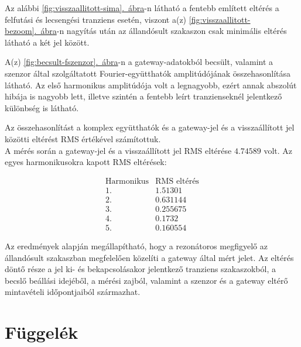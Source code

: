 \documentclass[12pt,a4paper]{article}
\newcommand{\abrara}[1]{\hyperref[#1]{\ref*{#1}.~ábra}}
\begin{document}
Az alábbi \abrara{fig:visszaallitott-sima}-n látható a fentebb említett eltérés a felfutási és lecsengési tranziens esetén, viszont a(z) \abrara{fig:visszaallitott-bezoom}-n nagyítás után az állandósult szakaszon csak minimális eltérés látható a két jel között.




A(z) \abrara{fig:becsult-fszenzor}-n a gateway-adatokból becsült, valamint a szenzor által
szolgáltatott Fourier-együtthatók amplitúdójának összehasonlítása látható. Az
első harmonikus amplitúdója volt a legnagyobb, ezért annak abszolút
hibája is nagyobb lett, illetve szintén a fentebb leírt tranzienseknél jelentkező különbség is látható.


Az összehasonlítást a komplex együtthatók és a gateway-jel és a visszaállított jel közötti eltérést RMS értékével számítottuk.\\

A mérés során a gateway-jel és a visszaállított jel RMS eltérése
$4.74589$ volt. Az egyes harmonikusokra kapott RMS eltérések:

\begin{equation}
\begin{array}{c|c}
\text{Harmonikus} & \text{RMS eltérés}\\
\hline
1. & 1.51301\\
2. & 0.631144\\
3. & 0.255675\\
4. & 0.1732\\
5. & 0.160554
\end{array}
\end{equation}

Az eredmények alapján megállapítható, hogy a rezonátoros megfigyelő az
állandósult szakaszban megfelelően közelíti a gateway által mért jelet.
Az eltérés döntő része a jel ki- és bekapcsolásakor jelentkező tranziens
szakaszokból, a becslő beállási idejéből, a mérési zajból, valamint a
szenzor és a gateway eltérő mintavételi időpontjaiból származhat.

\newpage
\section*{Függelék}
\end{document}
